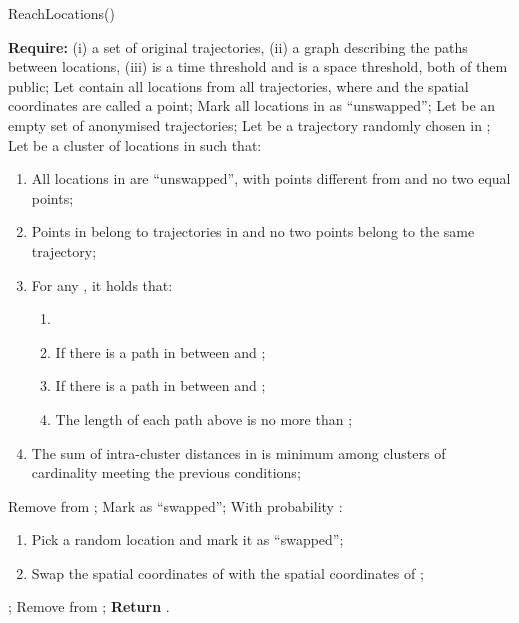 \begin{algorithm}[p]
\caption{ReachLocations()} \label{alg:reach}
\begin{algorithmic}[1]
\fontsize{11}{10}\selectfont
\STATE \textbf{Require:}
(i)  a set of original trajectories,
(ii)  a graph describing the paths between locations,
(iii)  is a time threshold and  is a space threshold, both
of them public;
\STATE Let  contain all locations from all trajectories, where
 and the spatial coordinates
 are called a point;
\STATE Mark all locations in  as ``unswapped'';
\STATE Let  be an empty set of anonymised trajectories;
    \STATE Let  be a trajectory randomly chosen in ;
        \STATE Let  be
	a cluster of locations in  such that: \label{line:bestCluster}
\begin{enumerate}
\item All locations in  are ``unswapped'', with points
different from  and no two equal points;
\item Points in  belong to trajectories
in 
and no two points belong to the same trajectory;
\item For any , it holds that:
\begin{enumerate}
\item 
\item If  there is a path in  between  
and  ;
\item If  there is a path in 
between  and ;
\item The length of each path above is no more than ;
\end{enumerate}
\item The sum of intra-cluster distances
in  is minimum among clusters
of cardinality  meeting the previous conditions;
\end{enumerate}
            \STATE Remove  from ;
        \ELSE
	    \STATE Mark  as ``swapped'';
            \STATE With probability :
	    \begin{enumerate}
	    \item Pick a random
	  location  and mark it as ``swapped'';
	    \item Swap the spatial
	    coordinates  of 
	    with the spatial coordinates 
	    of ;
	    \end{enumerate}
        \ENDIF
      \ENDIF
    \ENDFOR
    \STATE ;
    \STATE Remove  from ;
\ENDWHILE
\STATE \textbf{Return} .
\end{algorithmic}
\end{algorithm}


